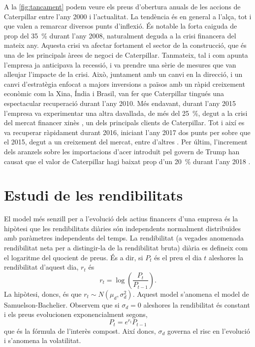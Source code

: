 \documentclass{article}
\numberwithin{table}{section}
\numberwithin{figure}{section}
\numberwithin{equation}{section}
\begin{document}
A la \cref{fig:tancament} podem veure els preus d'obertura anuals de les accions de Caterpillar entre l'any 2000 i l'actualitat. La tendència és en general a l'alça, tot i que valen a remarcar diversos punts d'inflexió. És notable la forta caiguda de prop del \SI{35}{\percent} durant l'any 2008, naturalment deguda a la crisi financera del mateix any. Aquesta crisi va afectar fortament el sector de la construcció, que és una de les principals àrees de negoci de Caterpillar. Tanmateix, tal i com apunta \cite{recupera} l'empresa ja anticipava la recessió, i va prendre una sèrie de mesures que van alleujar l'impacte de la crisi. Això, juntament amb un canvi en la direcció, i un canvi d'estratègia enfocat a majors inversions a països amb un ràpid creixement econòmic com la Xina, Índia i Brasil, van fer que Caterpillar tingués una espectacular recuperació durant l'any 2010. Més endavant, durant l'any 2015 l'empresa va experimentar una altra davallada, de més del \SI{25}{\percent}, degut a la crisi del mercat financer xinès \cite{xina}, un dels principals clients de Caterpillar. Tot i així es va recuperar ràpidament durant 2016, iniciant l'any 2017 dos punts per sobre que el 2015, degut a un creixement del mercat, entre d'altres \cite{crush}. Per últim, l'increment dels aranzels sobre les importacions d'acer introduït pel govern de Trump han causat que el valor de Caterpillar hagi baixat prop d'un \SI{20}{\percent} durant l'any 2018 \cite{trump}.


\section{Estudi de les rendibilitats}
El model més senzill per a l'evolució dels actius financers d'una empresa és la hipòtesi que les rendibilitats diàries són independents normalment distribuïdes amb paràmetres independents del temps. La rendibilitat (a vegades anomenada rendibilitat neta per a distingir-la de la rendibilitat bruta) diària es defineix com el logaritme del quocient de preus. És a dir, si \( P_t \) és el preu el dia \( t \) aleshores la rendibilitat d'aquest dia, \( r_t \) és
\begin{equation}
	r_t = \log{\left(\frac{P_t}{P_{t-1}}\right)}.
	\label{eq:rend}
\end{equation}
La hipòtesi, doncs, és que \( r_t \sim N(\mu_d, \sigma_d^2) \). Aquest model s'anomena el model de Samuelson-Bachelier. Observem que si \( \sigma_d = 0 \) aleshores la rendibilitat és constant i els preus evolucionen exponencialment segons,
\begin{equation*}
	P_t = e^{r_t}P_{t-1}
\end{equation*}
que és la fórmula de l'interès compost. Així doncs, \( \sigma_d \) governa el risc en l'evolució i s'anomena la volatilitat.\\
\end{document}
